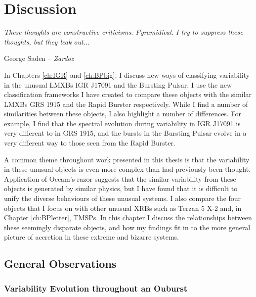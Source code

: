 \chapter{Discussion}

\epigraph{\textit{These thoughts are constructive criticisms. Pyramidical. I try to suppress these thoughts, but they leak out...}}{George Saden -- \textit{Zardoz}}

\vspace{1cm}

\par\noindent In Chapters \ref{ch:IGR} and \ref{ch:BPbig}, I discuss new ways of classifying variability in the unusual LMXBs IGR J17091 and the Bursting Pulsar.  I use the new classification frameworks I have created to compare these objects with the similar LMXBs GRS 1915 and the Rapid Burster respectively.  While I find a number of similarities between these objects, I also highlight a number of differences.  For example, I find that the spectral evolution during variability in IGR J17091 is very different to in GRS 1915, and the bursts in the Bursting Pulsar evolve in a very different way to those seen from the Rapid Burster.
\par A common theme throughout work presented in this thesis is that the variability in these unusual objects is even more complex than had previously been thought.  Application of Occam's razor \citep{Occam} suggests that the similar variability from these objects is generated by similar physics, but I have found that it is difficult to unify the diverse behaviours of these unusual systems.  I also compare the four objects that I focus on with other unusual XRBs such as Terzan 5 X-2 and, in Chapter \ref{ch:BPletter}, TMSPs.  In this chapter I discuss the relationships between these seemingly disparate objects, and how my findings fit in to the more general picture of accretion in these extreme and bizarre systems.

\section{General Observations}

\subsection{Variability Evolution throughout an Ouburst}

